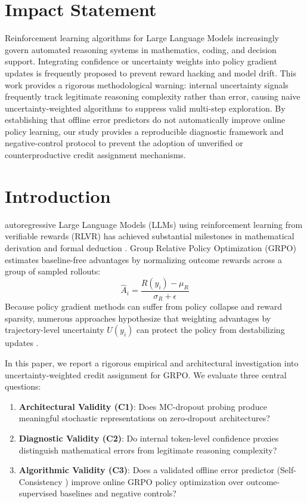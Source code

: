 \documentclass[journal]{IEEEtai}
\begin{document}
\section{Impact Statement}
Reinforcement learning algorithms for Large Language Models increasingly govern automated reasoning systems in mathematics, coding, and decision support. Integrating confidence or uncertainty weights into policy gradient updates is frequently proposed to prevent reward hacking and model drift. This work provides a rigorous methodological warning: internal uncertainty signals frequently track legitimate reasoning complexity rather than error, causing naive uncertainty-weighted algorithms to suppress valid multi-step exploration. By establishing that offline error predictors do not automatically improve online policy learning, our study provides a reproducible diagnostic framework and negative-control protocol to prevent the adoption of unverified or counterproductive credit assignment mechanisms.

\section{Introduction}
 autoregressive Large Language Models (LLMs) using reinforcement learning from verifiable rewards (RLVR) has achieved substantial milestones in mathematical derivation and formal deduction \cite{shao2024deepseekmath,cobbe2021gsm8k}. Group Relative Policy Optimization (GRPO) \cite{shao2024deepseekmath} estimates baseline-free advantages by normalizing outcome rewards across a group of sampled rollouts:
\begin{equation}
\hat{A}_i = \frac{R(y_i) - \mu_R}{\sigma_R + \epsilon}
\end{equation}
Because policy gradient methods can suffer from policy collapse and reward sparsity, numerous approaches hypothesize that weighting advantages by trajectory-level uncertainty $U(y_i)$ can protect the policy from destabilizing updates \cite{kadavath2022language,kuhn2023semantic}.

In this paper, we report a rigorous empirical and architectural investigation into uncertainty-weighted credit assignment for GRPO. We evaluate three central questions:
\begin{enumerate}
    \item \textbf{Architectural Validity (C1)}: Does MC-dropout probing produce meaningful stochastic representations on zero-dropout architectures?
    \item \textbf{Diagnostic Validity (C2)}: Do internal token-level confidence proxies distinguish mathematical errors from legitimate reasoning complexity?
    \item \textbf{Algorithmic Validity (C3)}: Does a validated offline error predictor (Self-Consistency \cite{wang2023selfconsistency}) improve online GRPO policy optimization over outcome-supervised baselines and negative controls?
\end{enumerate}
\end{document}
